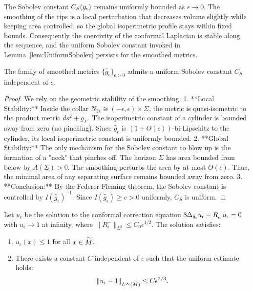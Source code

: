 \begin{remark}
The Sobolev constant $C_S(g_{\epsilon})$ remains uniformly bounded as $\epsilon \to 0$. The smoothing of the tips is a local perturbation that decreases volume slightly while keeping area controlled, so the global isoperimetric profile stays within fixed bounds. Consequently the coercivity of the conformal Laplacian is stable along the sequence, and the uniform Sobolev constant invoked in Lemma~\ref{lem:UniformSobolev} persists for the smoothed metrics.
\end{remark}

\begin{lemma}\label{lem:UniformSobolev}
The family of smoothed metrics $\{\hat{g}_\epsilon\}_{\epsilon>0}$ admits a uniform Sobolev constant $C_S$ independent of $\epsilon$.
\end{lemma}
\begin{proof}
We rely on the geometric stability of the smoothing.
1. **Local Stability:** Inside the collar $N_{2\epsilon} \cong (-\epsilon, \epsilon) \times \Sigma$, the metric is quasi-isometric to the product metric $ds^2 + g_\Sigma$. The isoperimetric constant of a cylinder is bounded away from zero (no pinching). Since $\hat{g}_\epsilon$ is $(1+O(\epsilon))$-bi-Lipschitz to the cylinder, its local isoperimetric constant is uniformly bounded.
2. **Global Stability:** The only mechanism for the Sobolev constant to blow up is the formation of a "neck" that pinches off. The horizon $\Sigma$ has area bounded from below by $A(\Sigma) > 0$. The smoothing perturbs the area by at most $O(\epsilon)$. Thus, the minimal area of any separating surface remains bounded away from zero.
3. **Conclusion:** By the Federer-Fleming theorem, the Sobolev constant is controlled by $I(\hat{g}_\epsilon)^{-1}$. Since $I(\hat{g}_\epsilon) \ge c > 0$ uniformly, $C_S$ is uniform.
\end{proof}

\begin{lemma}\label{lem:GreenEstimate}
Let $u_\epsilon$ be the solution to the conformal correction equation $8 \Delta_{\hat{g}_\epsilon} u_\epsilon - R^-_\epsilon u_\epsilon = 0$ with $u_\epsilon \to 1$ at infinity, where $\|R^-_\epsilon\|_{L^{2}} \le C_0 \epsilon^{1/2}$. The solution satisfies:
\begin{enumerate}
    \item $u_\epsilon(x) \le 1$ for all $x \in \widetilde{M}$.
    \item There exists a constant $C$ independent of $\epsilon$ such that the uniform estimate holds:
    \[ \|u_\epsilon - 1\|_{L^\infty(\widetilde{M})} \le C \epsilon^{2/3}. \]
\end{enumerate}
\end{lemma}

